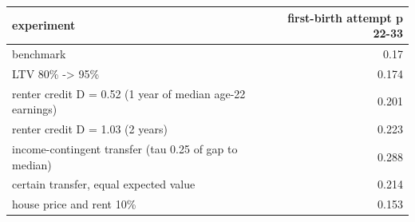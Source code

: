 \begin{tabular}{lr}
\toprule
experiment & first-birth attempt p 22-33 \\
\midrule
benchmark & 0.17 \\
LTV 80\% -> 95\% & 0.174 \\
renter credit D = 0.52 (1 year of median age-22 earnings) & 0.201 \\
renter credit D = 1.03 (2 years) & 0.223 \\
income-contingent transfer (tau 0.25 of gap to median) & 0.288 \\
certain transfer, equal expected value & 0.214 \\
house price and rent 10\% & 0.153 \\
\bottomrule
\end{tabular}
